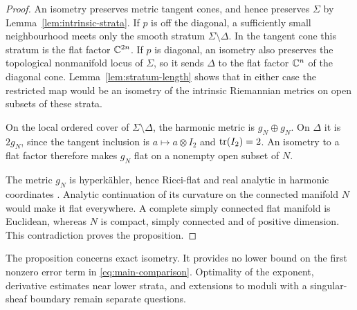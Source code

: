 \begin{proof}
An isometry preserves metric tangent cones,
and hence preserves $\Sigma$ by
Lemma~\ref{lem:intrinsic-strata}. If $p$ is
off the diagonal, a sufficiently small
neighbourhood meets only the smooth stratum
$\Sigma\setminus\Delta$. In the tangent
cone this stratum is the flat factor
$\mathbb C^{2n}$. If $p$ is diagonal, an isometry
also preserves the topological nonmanifold
locus of $\Sigma$, so it sends $\Delta$
to the flat factor $\mathbb C^n$ of the diagonal
cone. Lemma~\ref{lem:stratum-length} shows
that in either case the restricted map
would be an isometry of the intrinsic
Riemannian metrics on open subsets of
these strata.

On the local ordered cover of
$\Sigma\setminus\Delta$, the harmonic metric
is $g_N\oplus g_N$. On $\Delta$ it is
$2g_N$, since the tangent inclusion is
$a\mapsto a\otimes I_2$ and
$\operatorname{tr}(I_2)=2$. An isometry to a flat factor
therefore makes $g_N$ flat on a nonempty
open subset of $N$.

The metric $g_N$ is hyperk\"ahler, hence
Ricci-flat and real analytic in harmonic
coordinates \cite[Theorem~5.2]{dk81}.
Analytic continuation of its curvature on
the connected manifold $N$ would make it
flat everywhere. A complete simply
connected flat manifold is Euclidean,
whereas $N$ is compact, simply connected
and of positive dimension. This
contradiction proves the proposition.
\end{proof}

The proposition concerns exact isometry.
It provides no lower bound on the first
nonzero error term in
\eqref{eq:main-comparison}. Optimality of
the exponent, derivative estimates near
lower strata, and extensions to moduli
with a singular-sheaf boundary remain
separate questions.
